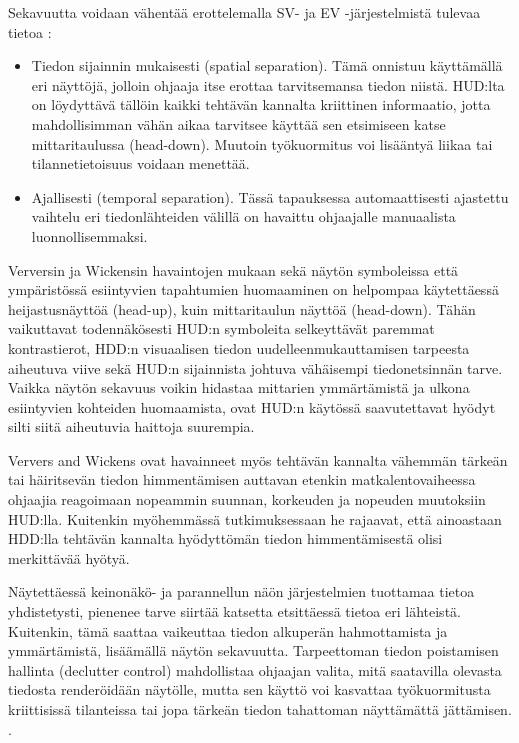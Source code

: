 \documentclass[utf8,bachelor,manualbib]{gradu3}
\begin{document}
Sekavuutta voidaan vähentää erottelemalla SV- ja EV -järjestelmistä tulevaa tietoa \citep{baileyym2007}:

\begin{itemize}
\item Tiedon sijainnin mukaisesti (spatial separation).
Tämä onnistuu käyttämällä eri näyttöjä, jolloin ohjaaja itse erottaa tarvitsemansa tiedon niistä. HUD:lta on löydyttävä tällöin kaikki tehtävän kannalta kriittinen informaatio, jotta mahdollisimman vähän aikaa  tarvitsee käyttää sen etsimiseen katse mittaritaulussa (head-down). Muutoin työkuormitus voi lisääntyä liikaa tai tilannetietoisuus voidaan menettää.
\item Ajallisesti (temporal separation).
Tässä tapauksessa automaattisesti ajastettu vaihtelu eri tiedonlähteiden välillä on havaittu ohjaajalle manuaalista luonnollisemmaksi.
\end{itemize}

Verversin ja Wickensin \citeyearpar{ververswickens1998} havaintojen mukaan sekä näytön symboleissa että ympäristössä esiintyvien tapahtumien huomaaminen on helpompaa käytettäessä heijastusnäyttöä (head-up), kuin mittaritaulun näyttöä (head-down). Tähän vaikuttavat todennäkösesti HUD:n symboleita selkeyttävät paremmat kontrastierot, HDD:n visuaalisen tiedon uudelleenmukauttamisen tarpeesta aiheutuva viive sekä HUD:n sijainnista johtuva vähäisempi tiedonetsinnän tarve. Vaikka näytön sekavuus voikin hidastaa mittarien ymmärtämistä ja ulkona esiintyvien kohteiden huomaamista, ovat HUD:n käytössä saavutettavat hyödyt silti siitä aiheutuvia haittoja suurempia.

Ververs and Wickens \citeyearpar{ververswickens1996} ovat havainneet myös tehtävän kannalta vähemmän tärkeän tai häiritsevän tiedon himmentämisen auttavan etenkin matkalentovaiheessa ohjaajia reagoimaan nopeammin suunnan, korkeuden ja nopeuden muutoksiin HUD:lla. Kuitenkin myöhemmässä tutkimuksessaan \citeyearpar{ververswickens1998} he rajaavat, että ainoastaan HDD:lla tehtävän kannalta hyödyttömän tiedon himmentämisestä olisi merkittävää hyötyä.

Näytettäessä keinonäkö- ja parannellun näön järjestelmien tuottamaa tietoa yhdistetysti, pienenee tarve siirtää katsetta etsittäessä tietoa eri lähteistä. Kuitenkin, tämä saattaa vaikeuttaa tiedon alkuperän hahmottamista ja ymmärtämistä, lisäämällä näytön sekavuutta. Tarpeettoman tiedon poistamisen hallinta (declutter control) mahdollistaa ohjaajan valita, mitä saatavilla olevasta tiedosta renderöidään näytölle, mutta sen käyttö voi kasvattaa työkuormitusta kriittisissä tilanteissa tai jopa tärkeän tiedon tahattoman näyttämättä jättämisen. \citep{baileyym2007}.
\end{document}
